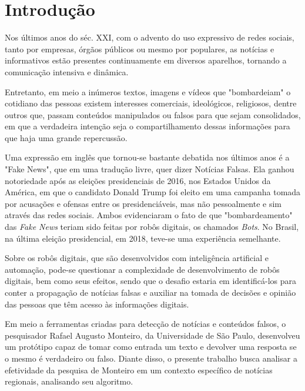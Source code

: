 %
%

\chapter{Introdução} 

Nos últimos anos do séc. XXI, com o advento do uso expressivo de redes sociais\cite{IBGE-internet}, tanto por empresas, órgãos públicos ou mesmo por populares, as notícias e informativos estão presentes continuamente em diversos aparelhos, tornando a comunicação intensiva e dinâmica.

Entretanto, em meio a inúmeros textos, imagens e vídeos que "bombardeiam" o cotidiano das pessoas existem interesses comerciais, ideológicos, religiosos, dentre outros\cite{UFSC-fake-news-perigos} que, passam conteúdos manipulados ou falsos para que sejam consolidados, em que a verdadeira intenção seja o compartilhamento dessas informações para que haja uma grande repercussão.

Uma expressão em inglês que tornou-se bastante debatida nos últimos anos é a "Fake News", que em uma tradução livre, quer dizer Notícias Falsas. Ela ganhou notoriedade após as eleições presidenciais de 2016, nos Estados Unidos da América\cite{Fake-eleicoes-usa}, em que o candidato Donald Trump foi eleito em uma campanha tomada por acusações e ofensas entre os presidenciáveis, mas não pessoalmente e sim através das redes sociais. Ambos evidenciaram o fato de que "bombardeamento" das \textit{Fake News} teriam sido feitas por robôs digitais, os chamados \textit{Bots}. No Brasil, na última eleição presidencial, em 2018, teve-se uma experiência semelhante.

Sobre os robôs digitais, que são desenvolvidos com inteligência artificial e automação, pode-se questionar a complexidade de desenvolvimento de robôs digitais, bem como seus efeitos, sendo que o desafio estaria em identificá-los para conter a propagação de notícias falsas e auxiliar na tomada de decisões e opinião das pessoas que têm acesso às informações digitais.

Em meio a ferramentas criadas para detecção de notícias e conteúdos falsos, o pesquisador Rafael Augusto Monteiro, da Universidade de São Paulo, desenvolveu um protótipo capaz de tomar como entrada um texto e devolver uma resposta se o mesmo é verdadeiro ou falso. Diante disso, o presente trabalho busca analisar a efetividade da pesquisa de Monteiro em um contexto específico de notícias regionais, analisando seu algoritmo.

